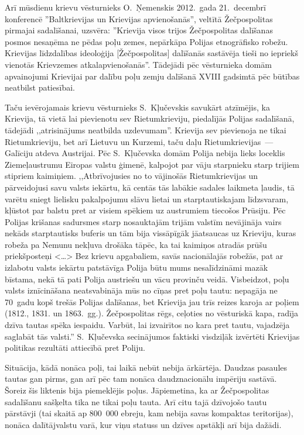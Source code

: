 \documentclass[twoside,a5paper,12pt,fleqn,openany]{extbook}
\newcommand{\citespace}{<\dots{}>}
\begin{document}
Arī mūsdienu krievu vēsturnieks O.~Ņemenskis 2012.~gada 21.~decembrī konferencē ''Baltkrievijas un Krievijas apvienošanās'', veltītā Žečpospolitas pirmajai sadalīšanai, uzsvēra: ''Krievija visos trijos Žečpospolitas dalīšanas posmos nesaņēma ne pēdas poļu zemes, nepārkāpa Polijas etnogrāfisko robežu. Krievijas līdzdalības ideoloģija [Žečpospolitas] dalīšanās sastāvēja tieši no iepriekš vienotās Krievzemes atkalapvienošanās''. Tādejādi pēc vēsturnieka domām apvainojumi Krievijai par dalību poļu zemju dalīšanā XVIII gadsimtā pēc būtības neatbilst patiesībai.

Taču ievērojamais krievu vēsturnieks S.~Kļučevskis savukārt atzīmējis, ka Krievija, tā vietā lai pievienotu sev Rietumkrieviju, piedalījās Polijas sadalīšanā, tādejādi ,,atrisinājums neatbilda uzdevumam''. Krievija sev pievienoja ne tikai Rietumkrieviju, bet arī Lietuvu un Kurzemi, taču daļu Rietumkrievijas~--- Galīciju atdeva Austrijai. Pēc S.~Kļučevska domām Polija nebija lieks loceklis Ziemeļaustrumu Eiropas valstu ģimenē, kalpojot par vāju starpnieku starp trijiem stipriem kaimiņiem. ,,Atbrīvojusies no to vājinošās Rietumkrievijas un pārveidojusi savu valsts iekārtu, kā centās tās labākie sadales laikmeta ļaudis, tā varētu sniegt lielisku pakalpojumu slāvu lietai un starptautiskajam līdzsvaram, kļūstot par balstu pret ar visiem spēkiem uz austrumiem tiecošos Prūsiju. Pēc Polijas krišanas sadursmes starp nosauktajām trijām valstīm nevājināja vairs nekāds starptautisks buferis un tām bija vissāpīgāk jāatsaucas uz Krieviju, kuras robeža pa Nemunu nekļuva drošāka tāpēc, ka tai kaimiņos atradās prūšu priekšposteņi \citespace{} Bez krievu apgabaliem, savās nacionālajās robežās, pat ar izlabotu valsts iekārtu patstāvīga Polija būtu mums nesalīdzināmi mazāk bīstama, nekā tā pati Polija austriešu un vācu provinču veidā. Visbeidzot, poļu valsts iznīcināšana neatsvabināja mūs no cīņas pret poļu tautu: nepagāja ne 70~gadu kopš trešās Polijas dalīšanas, bet Krievija jau trīs reizes karoja ar poļiem (1812., 1831. un 1863.~gg.). Žečpospolitas rēgs, ceļoties no vēsturiskā kapa, radīja dzīva tautas spēka iespaidu. Varbūt, lai izvairītos no kara pret tautu, vajadzēja saglabāt tās valsti.'' S.~Kļučevska secinājumos faktiski visdziļāk izvērtēti Krievijas politikas rezultāti attiecībā pret Poliju.

Situācija, kādā nonāca poļi, tai laikā nebūt nebija ārkārtēja. Daudzas pasaules tautas gan pirms, gan arī pēc tam nonāca daudznacionālu impēriju sastāvā. Šoreiz šis liktenis bija piemeklējis poļus. Jāpiemetina, ka ar Žečpospolitas sadalīšanu sašķelta tika ne tikai poļu tauta. Arī citu tajā dzīvojošo tautu pārstāvji (tai skaitā ap 800~000 ebreju, kam nebija savas kompaktas teritorijas), nonāca dalītājvalstu varā, kur viņu statuss un dzīves apstākļi arī bija dažādi.
\end{document}
